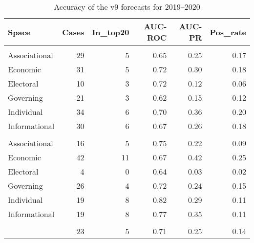 \begin{table}

\caption{\label{tab:v9-acc}Accuracy of the v9 forecasts for 2019--2020}
\centering
\begin{tabular}[t]{lrrrrr}
\toprule
Space & Cases & In\_top20 & AUC-ROC & AUC-PR & Pos\_rate\\
\midrule
\addlinespace[0.3em]
\multicolumn{6}{l}{\textbf{Closing movement}}\\
\hspace{1em}Associational & 29 & 5 & 0.65 & 0.25 & 0.17\\
\hspace{1em}Economic & 31 & 5 & 0.72 & 0.30 & 0.18\\
\hspace{1em}Electoral & 10 & 3 & 0.72 & 0.12 & 0.06\\
\hspace{1em}Governing & 21 & 3 & 0.62 & 0.15 & 0.12\\
\hspace{1em}Individual & 34 & 6 & 0.70 & 0.36 & 0.20\\
\hspace{1em}Informational & 30 & 6 & 0.67 & 0.26 & 0.18\\
\addlinespace[0.3em]
\multicolumn{6}{l}{\textbf{Opening movement}}\\
\hspace{1em}Associational & 16 & 5 & 0.75 & 0.22 & 0.09\\
\hspace{1em}Economic & 42 & 11 & 0.67 & 0.42 & 0.25\\
\hspace{1em}Electoral & 4 & 0 & 0.64 & 0.03 & 0.02\\
\hspace{1em}Governing & 26 & 4 & 0.72 & 0.24 & 0.15\\
\hspace{1em}Individual & 19 & 8 & 0.82 & 0.29 & 0.11\\
\hspace{1em}Informational & 19 & 8 & 0.77 & 0.35 & 0.11\\
\addlinespace[0.3em]
\multicolumn{6}{l}{\textbf{Average}}\\
\hspace{1em} & 23 & 5 & 0.71 & 0.25 & 0.14\\
\bottomrule
\end{tabular}
\end{table}
